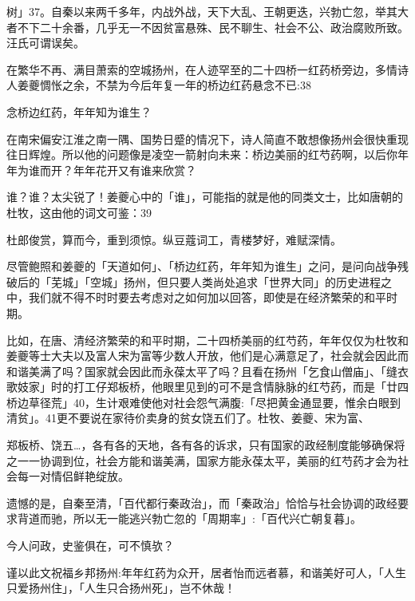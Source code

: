 \noindent 树」37。自秦以来两千多年，内战外战，天下大乱、王朝更迭，兴勃亡忽，举其大者不下二十余番，几乎无一不因贫富悬殊、民不聊生、社会不公、政治腐败所致。汪氏可谓误矣。

在繁华不再、满目萧索的空城扬州，在人迹罕至的二十四桥一红药桥旁边，多情诗人姜夔惆怅之余，不禁为今后年复一年的桥边红药悬念不已:38

\begin{BookQuote}
念桥边红药，年年知为谁生？
\end{BookQuote}

在南宋偏安江淮之南一隅、国势日蹙的情况下，诗人简直不敢想像扬州会很快重现往日辉煌。所以他的问题像是凌空一箭射向未来：桥边美丽的红芍药啊，以后你年年为谁而开？年年花开又有谁来欣赏？

谁？谁？太尖锐了！姜夔心中的「谁」，可能指的就是他的同类文士，比如唐朝的杜牧，这由他的词文可鉴：39

\begin{BookQuote}
杜郎俊赏，算而今，重到须惊。纵豆蔻词工，青楼梦好，难赋深情。
\end{BookQuote}

尽管鲍照和姜夔的「天道如何」、「桥边红药，年年知为谁生」之问，是问向战争残破后的「芜城」「空城」扬州，但只要人类尚处追求「世界大同」的历史进程之中，我们就不得不时时要去考虑对之如何加以回答，即使是在经济繁荣的和平时期。

比如，在唐、清经济繁荣的和平时期，二十四桥美丽的红芍药，年年仅仅为杜牧和姜夔等士大夫以及富人宋为富等少数人开放，他们是心满意足了，社会就会因此而和谐美满了吗？国家就会因此而永葆太平了吗？且看在扬州「乞食山僧庙」、「缝衣歌妓家」时的打工仔郑板桥，他眼里见到的可不是含情脉脉的红芍药，而是「廿四桥边草径荒」40，生计艰难使他对社会怨气满腹:「尽把黄金通显要，惟余白眼到清贫」。41更不要说在家待价卖身的贫女饶五们了。杜牧、姜夔、宋为富、

\vfill
\begin{BookNotes}
\end{BookNotes}

\noindent 郑板桥、饶五…，各有各的天地，各有各的诉求，只有国家的政经制度能够确保将之一一协调到位，社会方能和谐美满，国家方能永葆太平，美丽的红芍药才会为社会每一对情侣鲜艳绽放。

遗憾的是，自秦至清，「百代都行秦政治」，而「秦政治」恰恰与社会协调的政经要求背道而驰，所以无一能逃兴勃亡忽的「周期率」:「百代兴亡朝复暮」。

今人问政，史鉴俱在，可不慎欤？

谨以此文祝福乡邦扬州:年年红药为众开，居者怡而远者慕，和谐美好可人，「人生只爱扬州住」，「人生只合扬州死」，岂不休哉！


